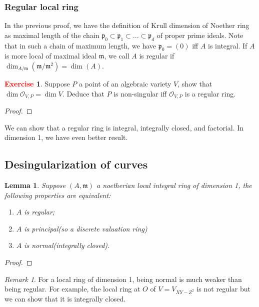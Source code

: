 \documentclass[12pt,a4paper,english]{article}
\theoremstyle{plain}
\newtheorem{lem}[thm]{Lemma}
\theoremstyle{definition}
\newtheorem{exercise}{\textbf{\textcolor{red}{Exercise}}}
\theoremstyle{remark}
\newtheorem*{rem}{Remark}
\begin{document}
\subsubsection{Regular local ring}
In the previous proof, we have the definition of Krull dimension of Noether ring as maximal length of the chain $\mathfrak{p}_{0}\subset\mathfrak{p}_{1}\subset...\subset\mathfrak{p}_{d}$ of proper prime ideals. Note that in such a chain of maximum length, we have $\mathfrak{p}_{0}=(0)$ iff $A$ is integral. If $A$ is more local of maximal ideal $\mathfrak{m}$, we call $A$ is regular if $\dim_{A/\mathfrak{m}}(\mathfrak{m}/\mathfrak{m}^{2})=\dim(A)$.
\begin{exercise}
Suppose $P$ a point of an algebraic variety $V$, show that $\dim \mathcal{O}_{V,P}=\dim V$. Deduce that $P$ is non-singular iff $\mathcal{O}_{V,P}$ is a regular ring.
\end{exercise}
\begin{tcolorbox}
\begin{proof}

\end{proof}
\end{tcolorbox}
We can show that a regular ring is integral, integrally closed, and factorial. In dimension 1, we have even better result. 
\subsection{Desingularization of curves}
\begin{lem}
Suppose $(A,\mathfrak{m})$ a noetherian local integral ring of dimension 1, the following properties are equivalent:
\begin{enumerate}
    \item $A$ is regular;
    \item $A$ is principal(so a discrete valuation ring)
    \item $A$ is normal(integrally closed).    
\end{enumerate}
\end{lem}
\begin{proof}

\end{proof}
\begin{rem}
For a local ring of dimension 1, being normal is much weaker than being regular. For example, the local ring at $O$ of $V=V_{XY-Z^{2}}$ is not regular but we can show that it is integrally closed.
\end{rem}
\end{document}
